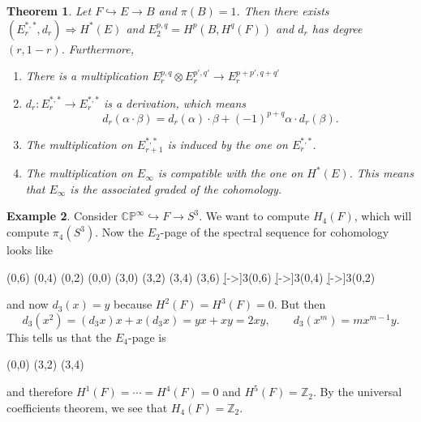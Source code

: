 \documentclass[leqno, openany]{memoir}
\newtheorem{thm}{Theorem}[section]
\theoremstyle{definition}
\newtheorem{exm}[thm]{Example}
\theoremstyle{remark}
\theoremstyle{plain}
\theoremstyle{definition}
\theoremstyle{remark}
\newcommand{\C}{\mathbb{C}}
\newcommand{\Z}{\mathbb{Z}}
\renewcommand{\P}{\mathbb{P}}
\begin{document}
\begin{thm}
    Let $F \hookrightarrow E \to B$ and $\pi(B) = 1$. Then there exists $(E_r^{*,*}, d_r) \Rightarrow H^*(E)$ and $E_2^{p,q} = H^p(B, H^q(F))$ and $d_r$ has degree $(r, 1-r)$. Furthermore,
    \begin{enumerate}
        \item There is a multiplication $E_{r}^{p,q} \otimes E_r^{p',q'} \to E_r^{p+p',q+q'}$
        \item $d_r \colon E_r^{*,*} \to E_r^{*,*}$ is a derivation, which means
            \[ d_r(\alpha \cdot \beta) = d_r(\alpha) \cdot \beta + {(-1)}^{p+q} \alpha \cdot d_r(\beta). \]
        \item The multiplication on $E_{r+1}^{*,*}$ is induced by the one on $E_r^{*,*}$.
        \item The multiplication on $E_{\infty}$ is compatible with the one on $H^*(E)$. This means that $E_{\infty}$ is the associated graded of the cohomology.
    \end{enumerate}
\end{thm}

\begin{exm}
    Consider $\C\P^{\infty} \hookrightarrow F \to S^3$. We want to compute $H_4(F)$, which will compute $\pi_4(S^3)$. Now the $E_2$-page of the spectral sequence for cohomology looks like
    \begin{center}
    \begin{sseqdata}[cohomological Serre grading, name = sphere, classes = {draw=none}]
        \class["\Z_{x^3}"](0,6)
        \class["\Z_{x^2}"](0,4)
        \class["\Z_{x}"](0,2)
        \class["\Z_1"](0,0)
        \class["\Z_y"](3,0)
        \class["\Z_{ xy }"](3,2)
        \class["\Z_{ x^2y }"](3,4)
        \class["\Z_{x^3y}"](3,6)
        \d[->]3(0,6)
        \d[->]3(0,4)
        \d[->]3(0,2)
    \end{sseqdata}
    \printpage[name=sphere,page=3, grid=chess]
    \end{center}
    and now $d_3(x) = y$ because $H^2(F) = H^3(F) = 0$. But then 
    \[ d_3(x^2) = (d_3 x) x + x (d_3 x) = yx + xy = 2xy, \qquad d_3(x^m) = m x^{m-1}y. \]
    This tells us that the $E_4$-page is
    \begin{center}
    \begin{sseqdata}[cohomological Serre grading, name = sphere4, classes = {draw=none}]
        \class["\Z"](0,0)
        \class["\Z_2"](3,2)
        \class["\Z_3"](3,4)
    \end{sseqdata}
    \printpage[name=sphere4,page=3, grid=chess]
    \end{center}
    and therefore $H^1(F) = \cdots = H^4(F) = 0$ and $H^5(F) = \Z_2$. By the universal coefficients theorem, we see that $H_4(F) = \Z_2$.
\end{exm}
\end{document}

